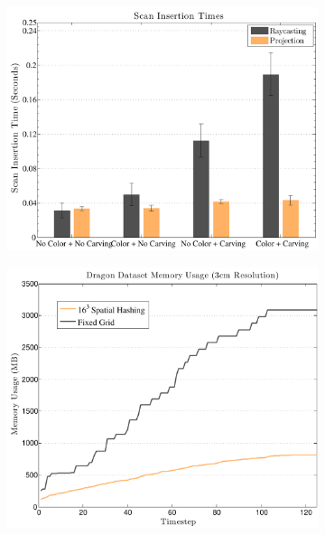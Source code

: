 \documentclass[10pt,twocolumn,letterpaper]{article}
\begin{document}
 
 \begin{figure}
  \centering
 \begin{subfigure}{0.75\columnwidth} \centering
\includegraphics[width=1.0\textwidth]{img/timing_data.pdf}
		 \caption{}
		 \label{fig:timing}
	 \end{subfigure} 
 \begin{subfigure}{0.75\columnwidth} \centering
\includegraphics[width=1.0\textwidth]{img/memoryusage.pdf}
		 \caption{} 
		 \label{fig:memory_data}
	 \end{subfigure}  
	  \begin{subfigure}{0.75\columnwidth} \centering

\end{subfigure}
\end{figure}
\end{document}
